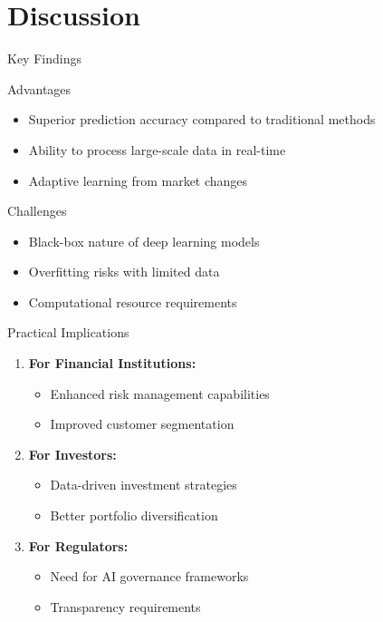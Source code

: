 \documentclass[aspectratio=169]{beamer}
\begin{document}
\section{Discussion}

\begin{frame}{Key Findings}
  \begin{block}{Advantages}
    \begin{itemize}
      \item Superior prediction accuracy compared to traditional methods
      \item Ability to process large-scale data in real-time
      \item Adaptive learning from market changes
    \end{itemize}
  \end{block}
  
  \begin{alertblock}{Challenges}
    \begin{itemize}
      \item Black-box nature of deep learning models
      \item Overfitting risks with limited data
      \item Computational resource requirements
    \end{itemize}
  \end{alertblock}
\end{frame}

\begin{frame}{Practical Implications}
  \begin{enumerate}
    \item \textbf{For Financial Institutions:}
    \begin{itemize}
      \item Enhanced risk management capabilities
      \item Improved customer segmentation
    \end{itemize}
    
    \vspace{0.3cm}
    
    \item \textbf{For Investors:}
    \begin{itemize}
      \item Data-driven investment strategies
      \item Better portfolio diversification
    \end{itemize}
    
    \vspace{0.3cm}
    
    \item \textbf{For Regulators:}
    \begin{itemize}
      \item Need for AI governance frameworks
      \item Transparency requirements
    \end{itemize}
  \end{enumerate}
\end{frame}
\end{document}
